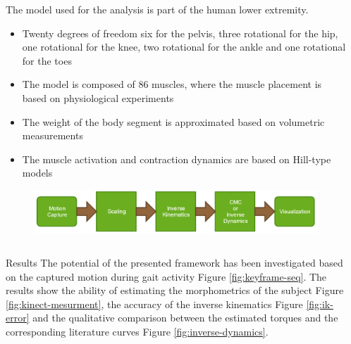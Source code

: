 \documentclass[final]{beamer}
\newlength{\sepwid}
\newlength{\twocolwid}
\begin{document}
\begin{frame}[t]
\begin{columns}[t]
\begin{column}{\sepwid}\end{column} %

\begin{column}{\twocolwid}\vspace{-1in} %
	
\begin{column}{\twocolwid}

	The model used for the analysis is part of the human lower extremity.
	
	\begin{itemize}
		\item Twenty degrees of freedom six for the pelvis, three rotational for the hip, one rotational for the knee, two rotational for the ankle and one rotational for the toes
		\item The model is composed of 86 muscles, where the muscle placement is based on physiological experiments
		\item The weight of the body segment is approximated based on volumetric measurements
		\item The muscle activation and contraction dynamics are based on Hill-type models
	\end{itemize}
	
	\begin{figure}[!t]
		\includegraphics[width=0.85\linewidth]{fig/pipeline.png}
	\end{figure}
	
\end{column} %


\begin{block}{Results}
	The potential of the presented framework has been investigated based on the captured motion during gait activity Figure \ref{fig:keyframe-seq}. The results show the ability of estimating the morphometrics of the subject Figure \ref{fig:kinect-mesurment}, the accuracy of the inverse kinematics Figure \ref{fig:ik-error} and the qualitative comparison between the estimated torques and the corresponding literature curves Figure \ref{fig:inverse-dynamics}.
\end{block}


\end{column}
\end{columns}
\end{frame}
\end{document}

